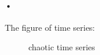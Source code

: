 \documentclass{article}
\begin{document}
\paragraph{•}The figure of time series:
\begin{figure}[htbp]
 \centering
 \caption{chaotic time series}
\end{figure}
\end{document}
